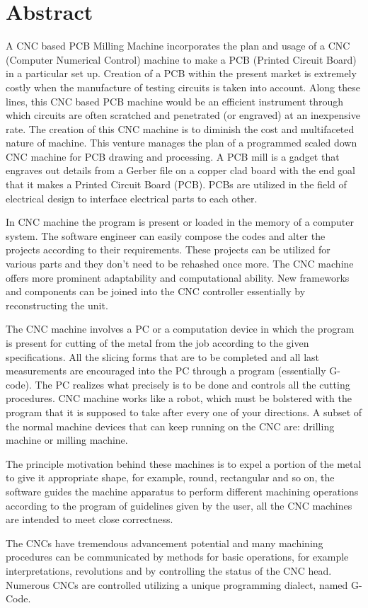 \chapter*{Abstract}

A CNC based PCB Milling Machine incorporates the plan and usage of a CNC (Computer Numerical Control) machine to make a PCB (Printed Circuit Board) in a particular set up. Creation of a PCB within the present market is extremely costly when the manufacture of testing circuits is taken into account. Along these lines, this CNC based PCB machine would be an efficient instrument through which circuits are often scratched and penetrated (or engraved) at an inexpensive rate. The creation of this CNC machine is to diminish the cost and multifaceted nature of machine. This venture manages the plan of a programmed scaled down CNC machine for PCB drawing and processing.
A PCB mill is a gadget that engraves out details from a Gerber file on a copper clad board with the end goal that it makes a Printed Circuit Board (PCB). PCBs are utilized in the field of electrical design to interface electrical parts to each other.

In CNC machine the program is present or loaded in the memory of a computer system. The software engineer can easily compose the codes and alter the projects according to their requirements. These projects can be utilized for various parts and they don’t need to be rehashed once more. The CNC machine offers more prominent adaptability and computational ability. New frameworks and components can be joined into the CNC controller essentially by reconstructing the unit.

The CNC machine involves a PC or a computation device in which the program is present for cutting of the metal from the job according to the given specifications. All the slicing forms that are to be completed and all last measurements are encouraged into the PC through a program (essentially G-code). The PC realizes what precisely is to be done and controls all the cutting procedures. CNC machine works like a robot, which must be bolstered with the program that it is supposed to take after every one of your directions. A subset of the normal machine devices that can keep running on the CNC are: drilling machine or milling machine.

The principle motivation behind these machines is to expel a portion of the metal to give it appropriate shape, for example, round, rectangular and so on, the software guides the machine apparatus to perform different machining operations according to the program of guidelines given by the user, all the CNC machines are intended to meet close correctness.

The CNCs have tremendous advancement potential and many machining procedures can be communicated by methods for basic operations, for example interpretations, revolutions and by controlling the status of the CNC head. Numerous CNCs are controlled utilizing a unique programming dialect, named G-Code.
